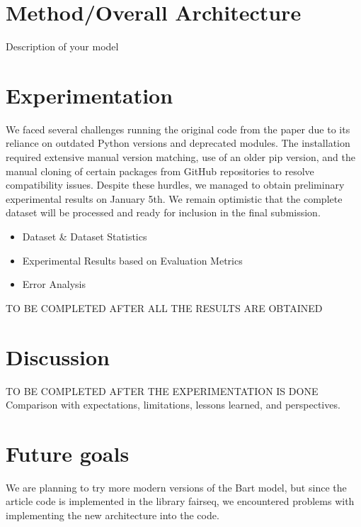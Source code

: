 \documentclass[12pt,a4paper]{article}
\begin{document}
\section*{Method/Overall Architecture}

Description of your model

\section*{Experimentation}


We faced several challenges running the original code from the paper due to its reliance on outdated Python versions and deprecated modules. The installation required extensive manual version matching, use of an older pip version, and the manual cloning of certain packages from GitHub repositories to resolve compatibility issues. Despite these hurdles, we managed to obtain preliminary experimental results on January 5th. We remain optimistic that the complete dataset will be processed and ready for inclusion in the final submission.
\ \\
\begin{itemize}

\item Dataset \& Dataset Statistics
\item Experimental Results based on Evaluation Metrics
\item Error Analysis
\end{itemize}

TO BE COMPLETED AFTER ALL THE RESULTS ARE OBTAINED

\section*{Discussion}

TO BE COMPLETED AFTER THE EXPERIMENTATION IS DONE
\ \\

Comparison with expectations, limitations, lessons learned, and perspectives.

\section*{Future goals}
We are planning to try more modern versions of the Bart model, but since the article code is implemented in the library fairseq, we encountered problems with implementing the new architecture into the code.




\end{document}
